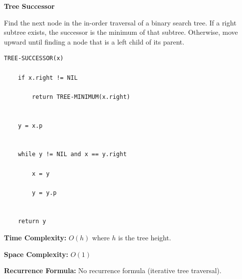 \documentclass[a4paper,12pt]{article}
\begin{document}
\begin{tcolorbox}[
    colback=gray!30,
    colframe=black,
    boxrule=1pt,
    arc=0mm
]

\begin{tcolorbox}[
    colback=gray!10,
    colframe=black,
    arc=0mm
]
\centering
{\Huge\bfseries Tree Successor}
\end{tcolorbox}


\begin{tcolorbox}[
    colback=gray!10,
    colframe=black,
    arc=0mm
]
\small
Find the next node in the in-order traversal of a binary search tree.
If a right subtree exists, the successor is the minimum of that subtree.
Otherwise, move upward until finding a node that is a left child of its parent.
\end{tcolorbox}


\begin{tcolorbox}[
    colback=black!5,
    colframe=black,
    arc=0mm,
    title=Pseudo-code
]
\tiny
\begin{lstlisting}
TREE-SUCCESSOR(x)

    if x.right != NIL

        return TREE-MINIMUM(x.right)


    y = x.p


    while y != NIL and x == y.right

        x = y

        y = y.p


    return y
\end{lstlisting}
\end{tcolorbox}


\begin{tcolorbox}[
    colback=cyan!20,
    colframe=black,
    arc=0mm
]
\small
\textbf{Time Complexity:}
$O(h)$ where $h$ is the tree height.
\end{tcolorbox}


\begin{tcolorbox}[
    colback=violet!20,
    colframe=black,
    arc=0mm
]
\small
\textbf{Space Complexity:}
$O(1)$
\end{tcolorbox}


\begin{tcolorbox}[
    colback=pink!20,
    colframe=black,
    arc=0mm
]
\small
\textbf{Recurrence Formula:}
No recurrence formula (iterative tree traversal).
\end{tcolorbox}

\end{tcolorbox}
\end{document}
